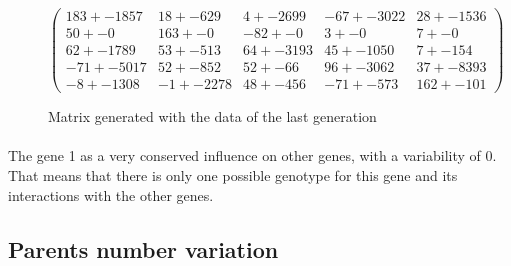 \documentclass[]{report} %
\begin{document}
    \begin{figure}[H] 
            \centering
            \small
    $
          \begin{pmatrix}
                183 +- 1857 & 18 +- 629 & 4 +- 2699 & -67 +- 3022 & 28 +- 1536 \\
                50 +- 0 & 163 +- 0 & -82 +- 0 & 3 +- 0 & 7 +- 0 \\
                62 +- 1789 & 53 +- 513 & 64 +- 3193 & 45 +- 1050 & 7 +- 154 \\
                -71 +- 5017 & 52 +- 852 & 52 +- 66 & 96 +- 3062 & 37 +- 8393 \\
                -8 +- 1308 & -1 +- 2278 & 48 +- 456 & -71 +- 573 & 162 +- 101 
          \end{pmatrix}
    $
            \caption{\footnotesize Matrix generated with the data of the last generation}
            \label{mat:ps300xg200xmr1-10-10}
    \end{figure}
    \paragraph*{}
    The gene 1 as a very conserved influence on other genes, with a variability of 0. That means that there is only one possible genotype for this gene and its interactions with the other genes.
    
    
\subsection{Parents number variation}
\end{document}
